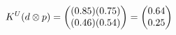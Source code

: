 \documentclass[preview]{standalone}
\begin{document}
\begin{align*}
\special{dvisvgm:raw <g id='unique000'>}K^U(d \otimes p) = \begin{pmatrix} (0.85)(0.75) \\ (0.46)(0.54) \end{pmatrix} = \begin{pmatrix} 0.64 \\ 0.25 \end{pmatrix}\special{dvisvgm:raw </g>}
\end{align*}
\end{document}

